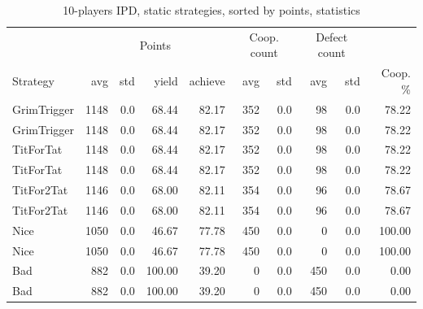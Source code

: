 \documentclass[journal,a4paper,10pt,twoside]{IEEEtran} %
\begin{document}
\begin{table}[ht]
	\caption{10-players IPD, static strategies, sorted by points, statistics}
	\label{tab:ipdmp10stat}
	\centering
	\begin{tabular}{l|rrrr|rrrrr}
		\toprule
		            &  \multicolumn{4}{c}{Points}   & \multicolumn{2}{c}{Coop. count} & \multicolumn{2}{c}{Defect count} &          \\
		Strategy    &  avg & std &  yield & achieve & avg &                       std & avg &                        std & Coop. \% \\
		\midrule
		GrimTrigger & 1148 & 0.0 &  68.44 &   82.17 & 352 &                       0.0 &  98 &                        0.0 &    78.22 \\
		GrimTrigger & 1148 & 0.0 &  68.44 &   82.17 & 352 &                       0.0 &  98 &                        0.0 &    78.22 \\
		TitForTat   & 1148 & 0.0 &  68.44 &   82.17 & 352 &                       0.0 &  98 &                        0.0 &    78.22 \\
		TitForTat   & 1148 & 0.0 &  68.44 &   82.17 & 352 &                       0.0 &  98 &                        0.0 &    78.22 \\
		TitFor2Tat  & 1146 & 0.0 &  68.00 &   82.11 & 354 &                       0.0 &  96 &                        0.0 &    78.67 \\
		TitFor2Tat  & 1146 & 0.0 &  68.00 &   82.11 & 354 &                       0.0 &  96 &                        0.0 &    78.67 \\
		Nice        & 1050 & 0.0 &  46.67 &   77.78 & 450 &                       0.0 &   0 &                        0.0 &   100.00 \\
		Nice        & 1050 & 0.0 &  46.67 &   77.78 & 450 &                       0.0 &   0 &                        0.0 &   100.00 \\
		Bad         &  882 & 0.0 & 100.00 &   39.20 &   0 &                       0.0 & 450 &                        0.0 &     0.00 \\
		Bad         &  882 & 0.0 & 100.00 &   39.20 &   0 &                       0.0 & 450 &                        0.0 &     0.00 \\
		\bottomrule
	\end{tabular}
\end{table}
\end{document}
